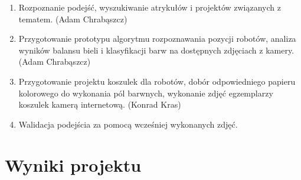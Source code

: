 \documentclass[polish,12pt]{aghthesis}
\begin{document}
\begin{enumerate}
\item Rozpoznanie podejść, wyszukiwanie atrykułów i projektów związanych z
tematem. (Adam Chrabąszcz)
\item Przygotowanie prototypu algorytmu rozpoznawania pozycji robotów,
analiza wyników balansu bieli i klasyfikacji barw na dostępnych zdjęciach z 
kamery. (Adam Chrabąszcz)
\item Przygotowanie projektu koszulek dla robotów, dobór odpowiedniego papieru
kolorowego do wykonania pól barwnych, wykonanie zdjęć egzemplarzy koszulek 
kamerą internetową. (Konrad Kras)
\item Walidacja podejścia za pomocą wcześniej wykonanych zdjęć.
\end{enumerate}


\section{Wyniki projektu}

\label{sec:wyniki-projektu}
% 


\end{document}
